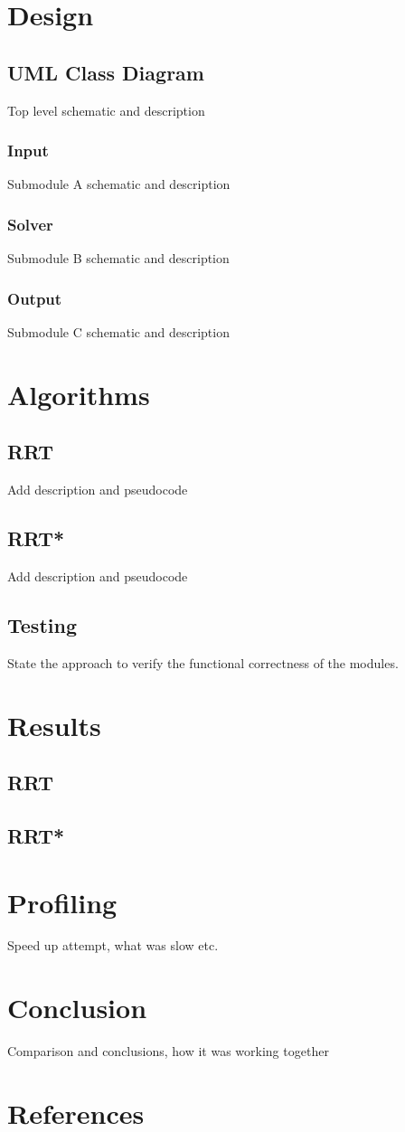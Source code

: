 \documentclass[10pt]{article}
\begin{document}
\section{Design}

\subsection{UML Class Diagram}
Top level schematic and description
\subsubsection{Input}
Submodule A schematic and description
\subsubsection{Solver}
Submodule B schematic and description
\subsubsection{Output}
Submodule C schematic and description

\section{Algorithms}

\subsection{RRT}
Add description and pseudocode 
\subsection{RRT*}
Add description and pseudocode 

\subsection{Testing}
State the approach to verify the functional correctness of the modules.

\section{Results}
\subsection{RRT}
\subsection{RRT*}

\section{Profiling}
Speed up attempt, what was slow etc. 

\section{Conclusion}
Comparison and conclusions, how it was working together

\section{References}
\end{document}
